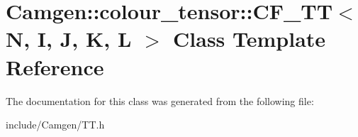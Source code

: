 \hypertarget{a00035}{}\section{Camgen\+:\+:colour\+\_\+tensor\+:\+:C\+F\+\_\+\+T\+T$<$ N, I, J, K, L $>$ Class Template Reference}
\label{a00035}


The documentation for this class was generated from the following file\+:\begin{DoxyCompactItemize}
\item 
include/\+Camgen/T\+T.\+h\end{DoxyCompactItemize}
